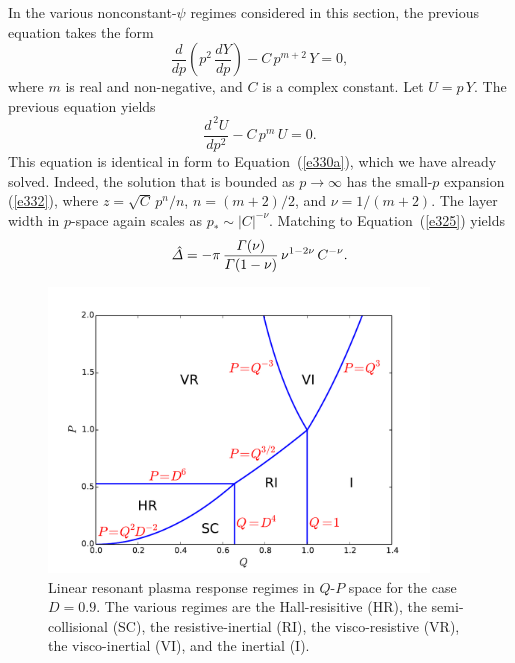 \documentclass[notitlepage,12pt]{article}
\begin{document}
In the various nonconstant-$\psi$ regimes considered in this section, the previous equation takes the form
\begin{equation}
\frac{d}{dp}\!\left(p^2\,\frac{dY}{dp}\right)-C\,p^{m+2}\,Y = 0,
\end{equation}
where $m$ is real and non-negative, and $C$ is a complex constant. Let $U=p\,Y$. The previous equation
yields
\begin{equation}
\frac{d^{\,2} U}{dp^2} - C\,p^m\,U = 0.
\end{equation}
This equation is identical in form to Equation~(\ref{e330a}), which we have already solved. Indeed, the solution that
is bounded as $p\rightarrow\infty$ has the small-$p$ expansion (\ref{e332}), where $z=\sqrt{C}\,p^n/n$, 
$n=(m+2)/2$, and $\nu=1/(m+2)$. The layer width in $p$-space again scales as $p_\ast\sim |C|^{-\nu}$. 
Matching to Equation~(\ref{e325}) yields
\begin{equation}
\hat{\mit\Delta} = -\pi\,\frac{{\mit\Gamma}(\nu)}{{\mit\Gamma}(1-\nu)}\,\nu^{1-2\nu}\,C^{-\nu}.
\end{equation}

\begin{figure}
\centerline{\includegraphics[width=0.9\textwidth]{RegimeI.pdf}}
\caption{Linear resonant plasma response regimes in $Q$-$P$ space for the case $D=0.9$. The various regimes are
the Hall-resisitive (HR), the semi-collisional (SC), the resistive-inertial (RI), the visco-resistive (VR), the visco-inertial
(VI), and the inertial (I).}\label{f1}
\end{figure}
\end{document}
